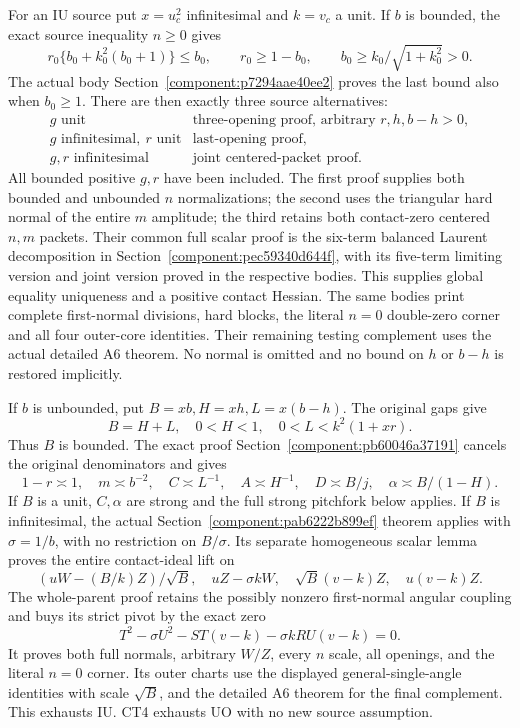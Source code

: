 For an IU source put \(x=u_c^2\) infinitesimal and
\(k=v_c\) a unit.  If \(b\) is bounded, the exact source
inequality \(n\geq0\) gives
\[
 r_0\{b_0+k_0^2(b_0+1)\}\leq b_0,\qquad
 r_0\geq1-b_0,\qquad
 b_0\geq k_0/\sqrt{1+k_0^2}>0 .                       \tag{CT10}
\]
The actual body Section~\ref{component:p7294aae40ee2} proves
the last bound also when \(b_0\geq1\).
There are then exactly three source alternatives:
\[
\begin{array}{c|l}
g\text{ unit}&\text{three-opening proof, arbitrary }r,h,b-h>0,\\
g\text{ infinitesimal},\ r\text{ unit}
             &\text{last-opening proof},\\
g,r\text{ infinitesimal}
             &\text{joint centered-packet proof}.
\end{array}\tag{CT11}
\]
All bounded positive \(g,r\) have been included.
The first proof supplies both bounded and unbounded \(n\)
normalizations; the second uses the triangular hard normal of
the entire \(m\) amplitude; the third retains both contact-zero
centered \(n,m\) packets.  Their common full scalar proof is the
six-term balanced Laurent decomposition in
Section~\ref{component:pec59340d644f}, with its five-term limiting
version and joint version proved in the respective bodies.
This supplies global equality uniqueness and a positive contact
Hessian.  The same bodies print complete first-normal divisions,
hard blocks, the literal \(n=0\) double-zero corner and all four
outer-core identities.  Their remaining testing complement uses
the actual detailed A6 theorem.  No normal is omitted and no
bound on \(h\) or \(b-h\) is restored implicitly.

If \(b\) is unbounded, put \(B=xb,H=xh,L=x(b-h)\).
The original gaps give
\[
 B=H+L,\quad 0<H<1,\quad 0<L<k^2(1+xr).
\]
Thus \(B\) is bounded.  The exact proof
Section~\ref{component:pb60046a37191} cancels the original
denominators and gives
\[
 1-r\asymp1,\quad m\asymp b^{-2},\quad
 C\asymp L^{-1},\quad A\asymp H^{-1},\quad
 D\asymp B/j,\quad \alpha\asymp B/(1-H).               \tag{CT12}
\]
If \(B\) is a unit, \(C,\alpha\) are strong and the full strong
pitchfork below applies.  If \(B\) is infinitesimal, the actual
Section~\ref{component:pab6222b899ef} theorem applies with
\(\sigma=1/b\), with no restriction on \(B/\sigma\).
Its separate homogeneous scalar lemma proves the entire
contact-ideal lift on
\[
 (uW-(B/k)Z)/\sqrt B,\quad uZ-\sigma kW,\quad
 \sqrt B(v-k)Z,\quad u(v-k)Z .
\tag{CT13}
\]
The whole-parent proof retains the possibly nonzero first-normal
angular coupling and buys its strict pivot by the exact zero
\[
 T^2-\sigma U^2-ST(v-k)-\sigma kRU(v-k)=0 .
\]
It proves both full normals, arbitrary \(W/Z\), every \(n\) scale,
all openings, and the literal \(n=0\) corner.  Its outer charts
use the displayed general-single-angle identities with scale
\(\sqrt B\), and the detailed A6 theorem for the final complement.
This exhausts IU.  CT4 exhausts UO with no new source assumption.

